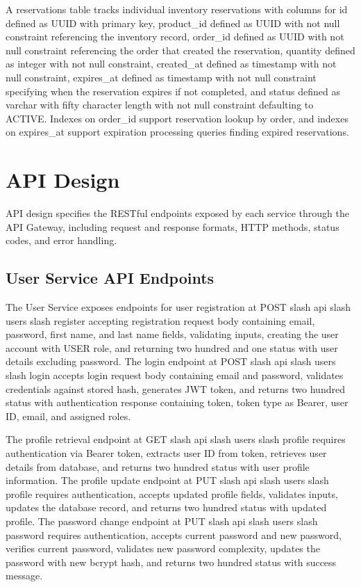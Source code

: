 A reservations table tracks individual inventory reservations with columns for id defined as UUID with primary key, product\_id defined as UUID with not null constraint referencing the inventory record, order\_id defined as UUID with not null constraint referencing the order that created the reservation, quantity defined as integer with not null constraint, created\_at defined as timestamp with not null constraint, expires\_at defined as timestamp with not null constraint specifying when the reservation expires if not completed, and status defined as varchar with fifty character length with not null constraint defaulting to ACTIVE. Indexes on order\_id support reservation lookup by order, and indexes on expires\_at support expiration processing queries finding expired reservations.

\section{API Design}

API design specifies the RESTful endpoints exposed by each service through the API Gateway, including request and response formats, HTTP methods, status codes, and error handling.

\subsection{User Service API Endpoints}

The User Service exposes endpoints for user registration at POST slash api slash users slash register accepting registration request body containing email, password, first name, and last name fields, validating inputs, creating the user account with USER role, and returning two hundred and one status with user details excluding password. The login endpoint at POST slash api slash users slash login accepts login request body containing email and password, validates credentials against stored hash, generates JWT token, and returns two hundred status with authentication response containing token, token type as Bearer, user ID, email, and assigned roles.

The profile retrieval endpoint at GET slash api slash users slash profile requires authentication via Bearer token, extracts user ID from token, retrieves user details from database, and returns two hundred status with user profile information. The profile update endpoint at PUT slash api slash users slash profile requires authentication, accepts updated profile fields, validates inputs, updates the database record, and returns two hundred status with updated profile. The password change endpoint at PUT slash api slash users slash password requires authentication, accepts current password and new password, verifies current password, validates new password complexity, updates the password with new bcrypt hash, and returns two hundred status with success message.

